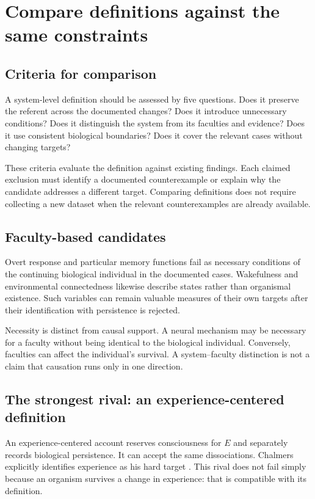 \documentclass[11pt,letterpaper]{article}
\begin{document}
\section{Compare definitions against the same constraints}
\subsection*{Criteria for comparison}
A system-level definition should be assessed by five questions. Does it preserve the referent across the documented changes? Does it introduce unnecessary conditions? Does it distinguish the system from its faculties and evidence? Does it use consistent biological boundaries? Does it cover the relevant cases without changing targets?

These criteria evaluate the definition against existing findings. Each claimed exclusion must identify a documented counterexample or explain why the candidate addresses a different target. Comparing definitions does not require collecting a new dataset when the relevant counterexamples are already available.

\subsection*{Faculty-based candidates}
Overt response and particular memory functions fail as necessary conditions of the continuing biological individual in the documented cases. Wakefulness and environmental connectedness likewise describe states rather than organismal existence. Such variables can remain valuable measures of their own targets after their identification with persistence is rejected.

Necessity is distinct from causal support. A neural mechanism may be necessary for a faculty without being identical to the biological individual. Conversely, faculties can affect the individual's survival. A system--faculty distinction is not a claim that causation runs only in one direction.

\subsection*{The strongest rival: an experience-centered definition}
An experience-centered account reserves consciousness for $E$ and separately records biological persistence. It can accept the same dissociations. Chalmers explicitly identifies experience as his hard target \cite{Chalmers1995}. This rival does not fail simply because an organism survives a change in experience: that is compatible with its definition.
\end{document}
